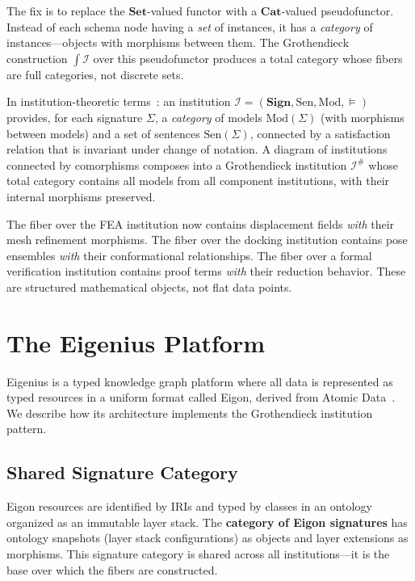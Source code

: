 \documentclass[10pt,twocolumn,letterpaper]{article}
\newcommand{\Sign}{\mathbf{Sign}}
\newcommand{\Sen}{\mathrm{Sen}}
\newcommand{\Mod}{\mathrm{Mod}}
\newcommand{\Cat}{\mathbf{Cat}}
\newcommand{\Set}{\mathbf{Set}}
\begin{document}
The fix is to replace the $\Set$-valued functor with a $\Cat$-valued pseudofunctor.
Instead of each schema node having a \emph{set} of instances, it has a \emph{category} of instances---objects with morphisms between them.
The Grothendieck construction $\int \mathcal{I}$ over this pseudofunctor produces a total category whose fibers are full categories, not discrete sets.

In institution-theoretic terms~\cite{goguen1992,diaconescu2008}: an institution $\mathcal{I} = (\Sign, \Sen, \Mod, \models)$ provides, for each signature $\Sigma$, a \emph{category} of models $\Mod(\Sigma)$ (with morphisms between models) and a set of sentences $\Sen(\Sigma)$, connected by a satisfaction relation that is invariant under change of notation.
A diagram of institutions connected by comorphisms composes into a Grothendieck institution $\mathcal{I}^\#$ whose total category contains all models from all component institutions, with their internal morphisms preserved.

The fiber over the FEA institution now contains displacement fields \emph{with} their mesh refinement morphisms.
The fiber over the docking institution contains pose ensembles \emph{with} their conformational relationships.
The fiber over a formal verification institution contains proof terms \emph{with} their reduction behavior.
These are structured mathematical objects, not flat data points.


\section{The Eigenius Platform}
\label{sec:eigenius}

Eigenius is a typed knowledge graph platform where all data is represented as typed resources in a uniform format called Eigon, derived from Atomic Data~\cite{atomicdata}.
We describe how its architecture implements the Grothendieck institution pattern.

\subsection{Shared Signature Category}

Eigon resources are identified by IRIs and typed by classes in an ontology organized as an immutable layer stack.
The \textbf{category of Eigon signatures} has ontology snapshots (layer stack configurations) as objects and layer extensions as morphisms.
This signature category is shared across all institutions---it is the base over which the fibers are constructed.
\end{document}
